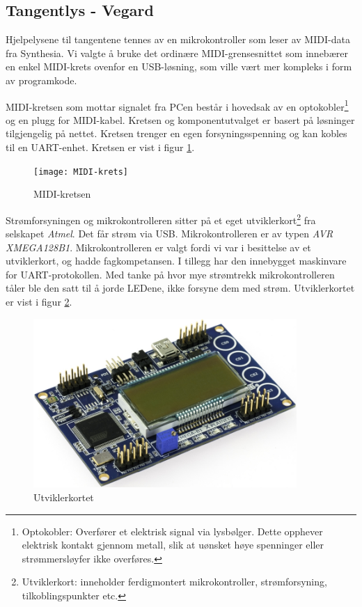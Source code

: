 \subsection{Tangentlys - Vegard}
Hjelpelysene til tangentene tennes av en mikrokontroller som leser av MIDI-data fra Synthesia. Vi valgte å bruke det ordinære MIDI-grensesnittet som innebærer en  enkel MIDI-krets ovenfor en USB-løsning, som ville vært mer kompleks i form av programkode. 

MIDI-kretsen som mottar signalet fra PCen består i hovedsak av en optokobler\footnote{Optokobler: Overfører et elektrisk signal via lysbølger. Dette opphever elektrisk kontakt gjennom metall, slik at uønsket høye spenninger eller strømmersløyfer ikke overføres.} og en plugg for MIDI-kabel. Kretsen og komponentutvalget er basert på løsninger tilgjengelig på nettet\cite{midi_avr}\cite{hackaday}. Kretsen trenger en egen forsyningsspenning og kan kobles til en UART-enhet. Kretsen er vist i figur \ref{fig:MIDI-krets}.

\begin{figure}[htbp]
	\centering
	\texttt{[image: MIDI-krets]}
	\caption{MIDI-kretsen}
	\label{fig:MIDI-krets}
\end{figure}

Strømforsyningen og mikrokontrolleren sitter på et eget utviklerkort\footnote{Utviklerkort: inneholder ferdigmontert mikrokontroller, strømforsyning, tilkoblingspunkter etc.} fra selskapet \emph{Atmel}. Det får strøm via USB. Mikrokontrolleren er av typen \emph{AVR XMEGA128B1}. Mikrokontrolleren er valgt fordi vi var i besittelse av et utviklerkort, og hadde fagkompetansen. I tillegg har den innebygget maskinvare for UART-protokollen. Med tanke på hvor mye strømtrekk mikrokontrolleren tåler ble den satt til å jorde LEDene, ikke forsyne dem med strøm. Utviklerkortet er vist i figur \ref{fig:utviklerkort}.

\begin{figure}[htbp]
	\centering
	\includegraphics[width=10cm]{Utviklerkort}
	\caption{Utviklerkortet}
	\label{fig:utviklerkort}
\end{figure}

